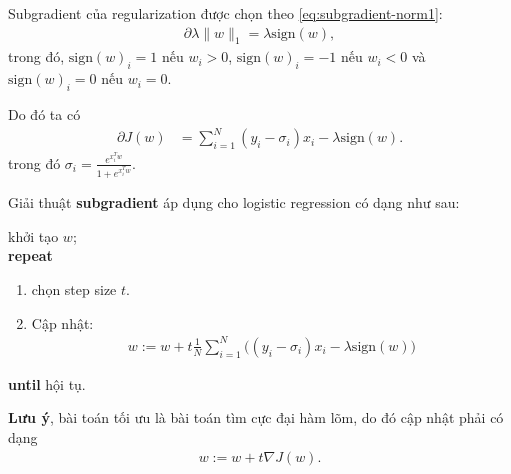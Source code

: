 \documentclass{book}
\begin{document}
Subgradient của regularization được chọn theo \eqref{eq:subgradient-norm1}:
\begin{align*}
\partial \lambda \|w\|_1 = \lambda \mathrm{sign}(w),
\end{align*}
trong đó, $\mathrm{sign}(w)_i = 1$ nếu $w_i > 0$, $\mathrm{sign}(w)_i = -1$ nếu $w_i < 0$ và $\mathrm{sign}(w)_i = 0$ nếu $w_i = 0$.

Do đó ta có
\begin{align*}
\partial J(w) & = \sum_{i=1}^N (y_i - \sigma_i)x_i - \lambda \mathrm{sign}(w).
\end{align*}
trong đó  $\sigma_i = \frac{e^{x_i^T w}}{1 + e^{x_i^T w}}$.
 
Giải thuật \textbf{subgradient} áp dụng cho logistic regression có dạng như sau:
\begin{algorithm}[H]
khởi tạo $w$;\\
\textbf{repeat} 
\begin{enumerate}
\item chọn step size $t$.
\item Cập nhật: 
\begin{align*}
w := w + t \frac{1}{N}\sum_{i=1}^N \Big((y_i - \sigma_i)x_i - \lambda \mathrm{sign}(w) \Big)
\end{align*}
\end{enumerate}
\textbf{until} hội tụ. 
\caption{Giải thuật subgradient gradient áp dụng cho logistic regression.}
\label{alg:subgradient_logistic}
\end{algorithm}


\textbf{Lưu ý}, bài toán tối ưu là bài toán tìm cực đại hàm lõm, do đó cập nhật phải có dạng
\begin{align}
w := w + t \nabla J(w).
\label{eq:grad_ascent}
\end{align}
\end{document}
